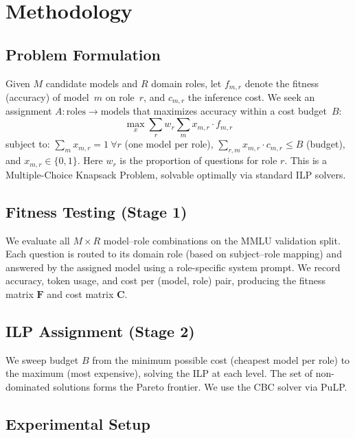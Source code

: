 \documentclass[sigconf,nonacm]{acmart}
\begin{document}
\section{Methodology}

\subsection{Problem Formulation}

Given $M$ candidate models and $R$ domain roles, let $f_{m,r}$ denote the fitness (accuracy) of model~$m$ on role~$r$, and $c_{m,r}$ the inference cost. We seek an assignment $A: \text{roles} \rightarrow \text{models}$ that maximizes accuracy within a cost budget~$B$:
\begin{equation}
\max_{x} \sum_{r} w_r \sum_{m} x_{m,r} \cdot f_{m,r}
\label{eq:obj}
\end{equation}
subject to: $\sum_{m} x_{m,r} = 1\ \forall r$ (one model per role), $\sum_{r,m} x_{m,r} \cdot c_{m,r} \leq B$ (budget), and $x_{m,r} \in \{0,1\}$. Here $w_r$ is the proportion of questions for role $r$. This is a Multiple-Choice Knapsack Problem, solvable optimally via standard ILP solvers.

\subsection{Fitness Testing (Stage 1)}

We evaluate all $M \times R$ model--role combinations on the MMLU validation split. Each question is routed to its domain role (based on subject--role mapping) and answered by the assigned model using a role-specific system prompt. We record accuracy, token usage, and cost per (model, role) pair, producing the fitness matrix $\mathbf{F}$ and cost matrix $\mathbf{C}$.

\subsection{ILP Assignment (Stage 2)}

We sweep budget $B$ from the minimum possible cost (cheapest model per role) to the maximum (most expensive), solving the ILP at each level. The set of non-dominated solutions forms the Pareto frontier. We use the CBC solver via PuLP.

\subsection{Experimental Setup}
\end{document}
